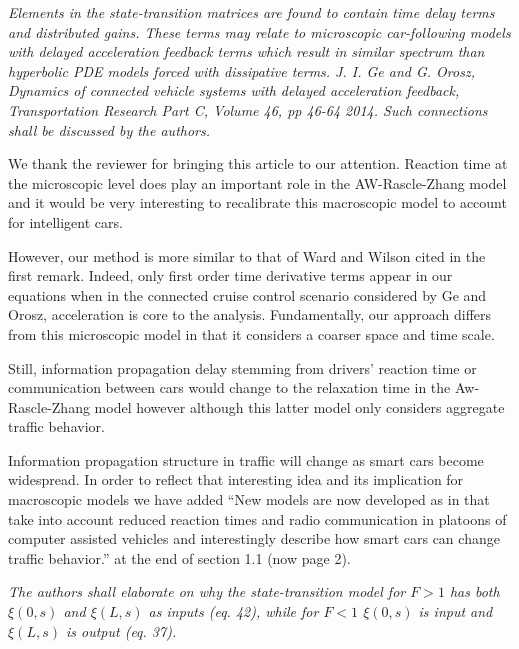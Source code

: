 \documentclass{article}
\begin{document}
\bigskip{}

\emph{
Elements in the state-transition matrices are found to contain time delay terms and distributed gains. These terms may relate to microscopic car-following models with delayed acceleration feedback terms which result in similar spectrum than hyperbolic PDE models forced with dissipative terms. J. I. Ge and G. Orosz, Dynamics of connected vehicle systems with delayed acceleration feedback, Transportation Research Part C, Volume 46, pp 46-64 2014. Such connections shall be discussed by the authors.
}

We thank the reviewer for bringing this article to our attention. Reaction time at the microscopic level does play an important role in the AW-Rascle-Zhang model and it would be very interesting to recalibrate this macroscopic model to account for intelligent cars. 

However, our method is more similar to that of Ward and Wilson cited in the first remark. Indeed, only first order time derivative terms appear in our equations when in the connected cruise control scenario considered by Ge and Orosz, acceleration is core to the analysis. Fundamentally, our approach differs from this microscopic model in that it considers a coarser space and time scale. 

Still, information propagation delay stemming from drivers' reaction time or communication between cars would change to the relaxation time in the Aw-Rascle-Zhang model however although this latter model only considers aggregate traffic behavior.

Information propagation structure in traffic will change as smart cars become widespread. In order to reflect that interesting idea and its implication for macroscopic models we have added ``New models are now developed as in \cite{jin2014dynamics} that take into account reduced reaction times and radio communication in platoons of computer assisted vehicles and interestingly describe how smart cars can change traffic behavior.'' at the end of section 1.1 (now page 2).

\bigskip{}

\emph{
The authors shall elaborate on why the state-transition model for $F>1$ has both $\xi(0,s)$ and $\xi(L,s)$ as inputs (eq. 42), while for $F<1$ $\xi(0,s)$ is input and $\xi(L,s)$ is output (eq. 37).
}
\end{document}
